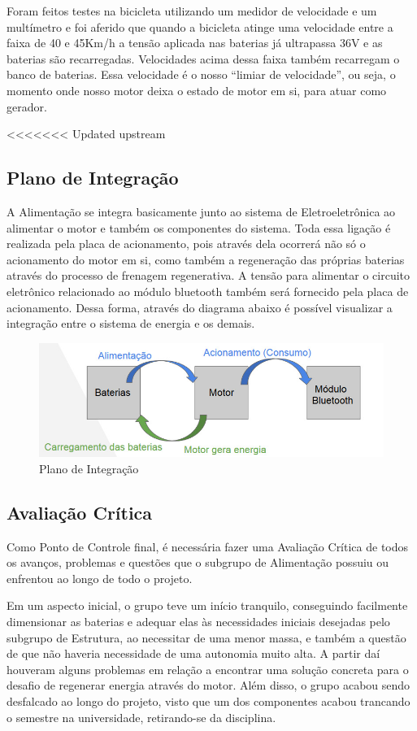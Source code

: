 Foram feitos testes na bicicleta utilizando um medidor de velocidade e um multímetro e foi aferido que quando a bicicleta atinge uma velocidade entre a faixa de 40 e 45Km/h a tensão aplicada nas baterias já ultrapassa 36V e as baterias são recarregadas. Velocidades acima dessa faixa também recarregam o banco de baterias. Essa velocidade é o nosso “limiar de velocidade”, ou seja, o momento onde nosso motor deixa o estado de motor em si, para atuar como gerador.

<<<<<<< Updated upstream
\subsection{Plano de Integração}
A Alimentação se integra basicamente junto ao sistema de Eletroeletrônica ao alimentar o motor e também os componentes do sistema. Toda essa ligação é realizada pela placa de acionamento, pois através dela ocorrerá não só o acionamento do motor em si, como também a regeneração das próprias baterias através do processo de frenagem regenerativa. A tensão para alimentar o circuito eletrônico relacionado ao módulo bluetooth também será fornecido pela placa de acionamento. Dessa forma, através do diagrama abaixo é possível visualizar a integração entre o sistema de energia e os demais. 

\graphicspath{{figuras/}}
\begin{figure}[h!]
\centering
\includegraphics[scale=0.50]{integracao_alimentacao}
\caption{Plano de Integração}
\label{plano_integracao}
\end{figure}

\subsection{Avaliação Crítica}
	Como Ponto de Controle final, é necessária fazer uma Avaliação Crítica de todos os avanços, problemas e questões que o subgrupo de Alimentação possuiu ou enfrentou ao longo de todo o projeto. 
	
	Em um aspecto inicial, o grupo teve um início tranquilo, conseguindo facilmente dimensionar as baterias e adequar elas às necessidades iniciais desejadas pelo subgrupo de Estrutura, ao necessitar de uma menor massa, e também a questão de que não haveria necessidade de uma autonomia muito alta. A partir daí houveram alguns problemas em relação a encontrar uma solução concreta para o desafio de regenerar energia através do motor. Além disso, o grupo acabou sendo desfalcado ao longo do projeto, visto que um dos componentes acabou trancando o semestre na universidade, retirando-se da disciplina. 
	
